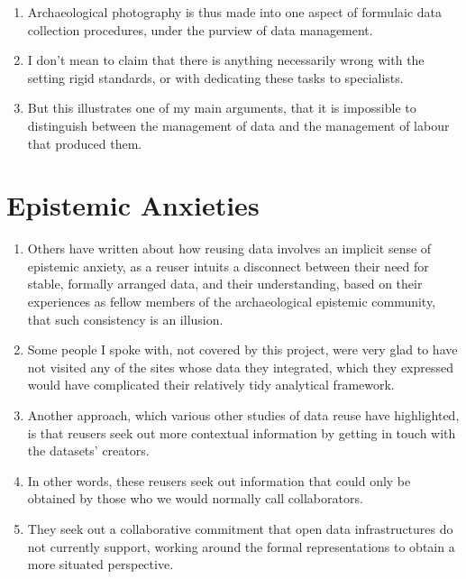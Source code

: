 \documentclass[12pt]{article}
\begin{document}
\begin{enumerate}
  \item Archaeological photography is thus made into one aspect of formulaic data collection procedures, under the purview of data management.
  \item I don't mean to claim that there is anything necessarily wrong with the setting rigid standards, or with dedicating these tasks to specialists.
  \item But this illustrates one of my main arguments, that it is impossible to distinguish between the management of data and the management of labour that produced them.
\end{enumerate}

\section{Epistemic Anxieties}
\begin{enumerate}
  \item Others have written about how reusing data involves an implicit sense of epistemic anxiety, as a reuser intuits a disconnect between their need for stable, formally arranged data, and their understanding, based on their experiences as fellow members of the archaeological epistemic community, that such consistency is an illusion.
  \item Some people I spoke with, not covered by this project, were very glad to have not visited any of the sites whose data they integrated, which they expressed would have complicated their relatively tidy analytical framework.
  \item Another approach, which various other studies of data reuse have highlighted, is that reusers seek out more contextual information by getting in touch with the datasets' creators.
  \item In other words, these reusers seek out information that could only be obtained by those who we would normally call collaborators.
  \item They seek out a collaborative commitment that open data infrastructures do not currently support, working around the formal representations to obtain a more situated perspective.
\end{enumerate}
\end{document}
